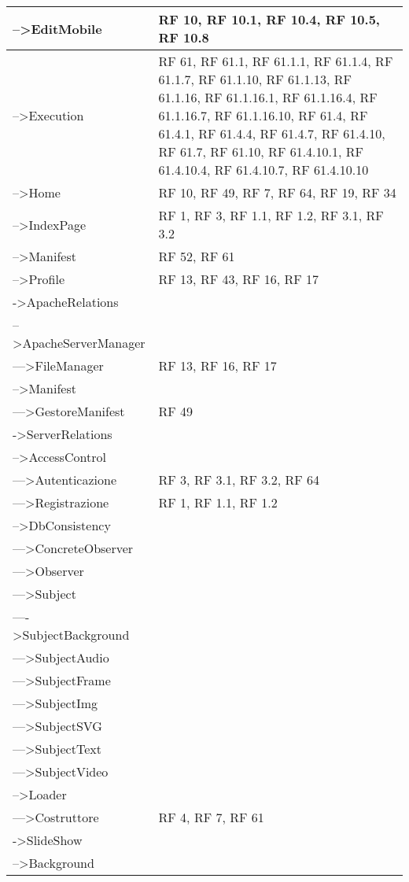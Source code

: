 {\begin{longtable} [c]{| p{8cm} | p{5cm} |}
 \hline 
-->EditMobile & RF 10, RF 10.1, RF 10.4, RF 10.5, RF 10.8\\ 
 \hline 
-->Execution & RF 61, RF 61.1, RF 61.1.1, RF 61.1.4, RF 61.1.7, RF 61.1.10, RF 61.1.13, RF 61.1.16, RF 61.1.16.1, RF 61.1.16.4, RF 61.1.16.7, RF 61.1.16.10, RF 61.4, RF 61.4.1, RF 61.4.4, RF 61.4.7, RF 61.4.10, RF 61.7, RF 61.10, RF 61.4.10.1, RF 61.4.10.4, RF 61.4.10.7, RF 61.4.10.10\\ 
 \hline 
-->Home & RF 10, RF 49, RF 7, RF 64, RF 19, RF 34\\ 
 \hline 
-->IndexPage & RF 1, RF 3, RF 1.1, RF 1.2, RF 3.1, RF 3.2\\ 
 \hline 
-->Manifest & RF 52, RF 61\\ 
 \hline 
-->Profile & RF 13, RF 43, RF 16, RF 17\\ 
 \hline 
->ApacheRelations & \\ 
 \hline 
-->ApacheServerManager & \\ 
 \hline 
--->FileManager & RF 13, RF 16, RF 17\\ 
 \hline 
-->Manifest & \\ 
 \hline 
--->GestoreManifest & RF 49\\ 
 \hline 
->ServerRelations & \\ 
 \hline 
-->AccessControl & \\ 
 \hline 
--->Autenticazione & RF 3, RF 3.1, RF 3.2, RF 64\\ 
 \hline 
--->Registrazione & RF 1, RF 1.1, RF 1.2\\ 
 \hline 
-->DbConsistency & \\ 
 \hline 
--->ConcreteObserver & \\ 
 \hline 
--->Observer & \\ 
 \hline 
--->Subject & \\ 
 \hline 
---->SubjectBackground & \\ 
 \hline 
--->SubjectAudio & \\ 
 \hline 
--->SubjectFrame & \\ 
 \hline 
--->SubjectImg & \\ 
 \hline 
--->SubjectSVG & \\ 
 \hline 
--->SubjectText & \\ 
 \hline 
--->SubjectVideo & \\ 
 \hline 
-->Loader & \\ 
 \hline 
--->Costruttore & RF 4, RF 7, RF 61\\ 
 \hline 
->SlideShow & \\ 
 \hline 
-->Background & \\ 

\end{longtable}}
